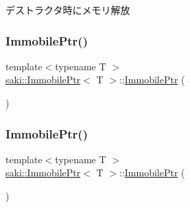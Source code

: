 デストラクタ時にメモリ解放 

\mbox{\label{classsaki_1_1_immobile_ptr_a890a531c0e6371987cfe352196c06d3f}} 
\subsubsection{\texorpdfstring{Immobile\+Ptr()}{ImmobilePtr()}\hspace{0.1cm}{\footnotesize\ttfamily [2/3]}}
{\footnotesize\ttfamily template$<$typename T $>$ \\
\mbox{\hyperlink{classsaki_1_1_immobile_ptr}{saki\+::\+Immobile\+Ptr}}$<$ T $>$\+::\mbox{\hyperlink{classsaki_1_1_immobile_ptr}{Immobile\+Ptr}} (\begin{DoxyParamCaption}\item[{const \mbox{\hyperlink{classsaki_1_1_immobile_ptr}{Immobile\+Ptr}}$<$ T $>$ \&}]{ }\end{DoxyParamCaption})\hspace{0.3cm}{\ttfamily [delete]}}

\mbox{\label{classsaki_1_1_immobile_ptr_acfc2a0ddb90c0acaaabfdeb98b10625c}} 
\subsubsection{\texorpdfstring{Immobile\+Ptr()}{ImmobilePtr()}\hspace{0.1cm}{\footnotesize\ttfamily [3/3]}}
{\footnotesize\ttfamily template$<$typename T $>$ \\
\mbox{\hyperlink{classsaki_1_1_immobile_ptr}{saki\+::\+Immobile\+Ptr}}$<$ T $>$\+::\mbox{\hyperlink{classsaki_1_1_immobile_ptr}{Immobile\+Ptr}} (\begin{DoxyParamCaption}\item[{\mbox{\hyperlink{classsaki_1_1_immobile_ptr}{Immobile\+Ptr}}$<$ T $>$ \&\&}]{ }\end{DoxyParamCaption})\hspace{0.3cm}{\ttfamily [delete]}}



